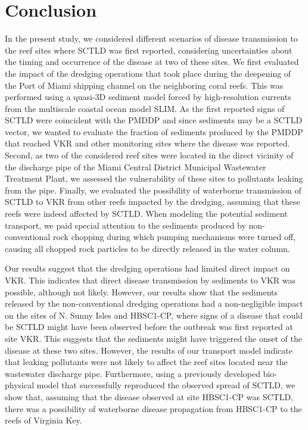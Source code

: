 \documentclass[preprint,12pt,authoryear]{elsarticle}
\begin{document}
\section{Conclusion}

In the present study, we considered different scenarios of disease transmission to the reef sites where SCTLD was first reported, considering uncertainties about the timing and occurrence of the disease at two of these sites. We first evaluated the impact of the dredging operations that took place during the deepening of the Port of Miami shipping channel on the neighboring coral reefs. This was performed using a quasi-3D sediment model forced by high-resolution currents from the multiscale coastal ocean model SLIM. As the first reported signs of SCTLD were coincident with the PMDDP and since sediments may be a SCTLD vector, we wanted to evaluate the fraction of sediments produced by the PMDDP that reached VKR and other monitoring sites where the disease was reported. Second, as two of the considered reef sites were located in the direct vicinity of the discharge pipe of the Miami Central District Municipal Wastewater Treatment Plant, we assessed the vulnerability of these sites to pollutants leaking from the pipe. Finally, we evaluated the possibility of waterborne transmission of SCTLD to VKR from other reefs impacted by the dredging, assuming that these reefs were indeed affected by SCTLD. When modeling the potential sediment transport, we paid special attention to the sediments produced by non-conventional rock chopping during which pumping mechanisms were turned off, causing all chopped rock particles to be directly released in the water column.

Our results suggest that the dredging operations had limited direct impact on VKR. This indicates that direct disease transmission by sediments to VKR was possible, although not likely. However, our results show that the sediments released by the non-conventional dredging operations had a non-negligible impact on the sites of N. Sunny Isles and HBSC1-CP, where signs of a disease that could be SCTLD might have been observed before the outbreak was first reported at site VKR. This suggests that the sediments might have triggered the onset of the disease at these two sites. However, the results of our transport model indicate that leaking pollutants were not likely to affect the reef sites located near the wastewater discharge pipe. Furthermore, using a previously developed bio-physical model that successfully reproduced the observed spread of SCTLD, we show that, assuming that the disease observed at site HBSC1-CP was SCTLD, there was a possibility of waterborne disease propagation from HBSC1-CP to the reefs of Virginia Key.
\end{document}
